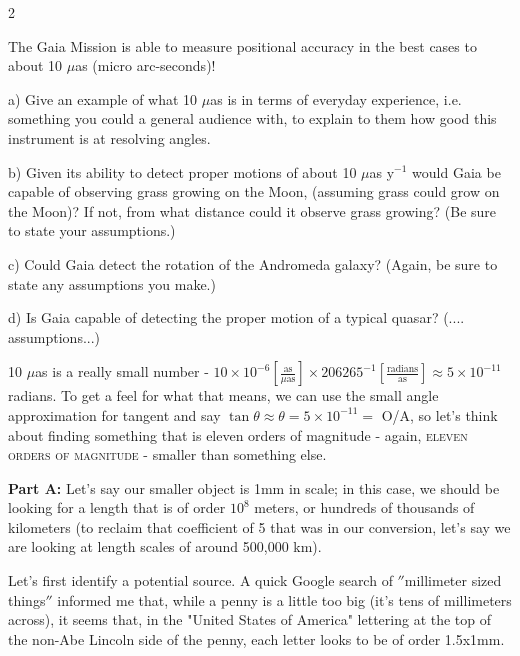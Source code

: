 \documentclass[12pt]{article}
\newenvironment{problem}[2][Problem]{\begin{trivlist}
\item[\hskip \labelsep {\bfseries #1}\hskip \labelsep {\bfseries #2.}]}{\end{trivlist}}
\newenvironment{answer}[2][Answer]{\begin{trivlist}
\item[\hskip \labelsep {\bfseries #1}\hskip \labelsep {\bfseries #2.}]}{\end{trivlist}}
\newcommand\textlcsc[1]{\textsc{\MakeLowercase{#1}}}
\begin{document}
\begin{multicols*}{2}
\begin{answer}{4}
\end{answer}







\begin{problem}{5} The Gaia Mission is able to measure positional accuracy in the best cases to about 10 $\mu$as (micro arc-seconds)!

a) Give an example of what 10 $\mu$as is in terms of everyday experience, i.e. something you could a general audience with, to explain to them how good this instrument is at resolving angles.

b) Given its ability to detect proper motions of about 10 $\mu$as y$^{-1}$ would Gaia be capable of observing grass growing on the Moon, (assuming grass could grow on the Moon)? If not, from what distance could it observe grass growing? (Be sure to state your assumptions.)

c) Could Gaia detect the rotation of the Andromeda galaxy? (Again, be sure to state any assumptions you make.)

d) Is Gaia capable of detecting the proper motion of a typical quasar? (.... assumptions...)

\end{problem}

\begin{answer}{5}
10 $\mu$as is a really small number - $10 \times 10^{-6} [\frac{\text{as}}{\mu\text{as}}] \times 206265^{-1} [\frac{\text{radians}}{\text{as}}] \approx 5 \times 10^{-11}$ radians. To get a feel for what that means, we can use the small angle approximation for tangent and say $\tan{\theta} \approx \theta = 5 \times 10^{-11} =$ O/A, so let's think about finding something that is eleven orders of magnitude - again, \textlcsc{eleven orders of magnitude} - smaller than something else.

\bigskip
\noindent \textbf{Part A: }Let's say our smaller object is 1mm in scale; in this case, we should be looking for a length that is of order $10^8$ meters, or hundreds of thousands of kilometers (to reclaim that coefficient of 5 that was in our conversion, let's say we are looking at length scales of around 500,000 km). \bigskip

Let's first identify a potential source. A quick Google search of $''$millimeter sized things$''$ informed me that, while a penny is a little too big (it's tens of millimeters across), it seems that, in the "United States of America" lettering at the top of the non-Abe Lincoln side of the penny, each letter looks to be of order 1.5x1mm. \bigskip


\end{answer}
\end{multicols*}
\end{document}
